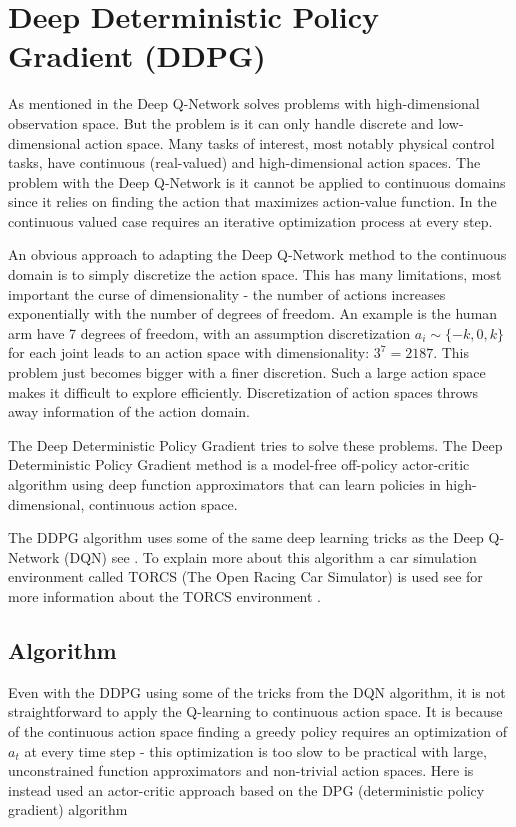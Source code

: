 \section{Deep Deterministic Policy Gradient (DDPG)}\label{DDPG}
As mentioned in  the Deep Q-Network solves problems with high-dimensional observation space. But the problem is it can only handle discrete and low-dimensional action space. Many tasks of interest, most notably physical control tasks, have continuous (real-valued) and high-dimensional action spaces. The problem with the Deep Q-Network is it cannot be applied to continuous domains since it relies on finding the action that maximizes action-value function. In the continuous valued case requires an iterative optimization process at every step. \cite{DBLP:journals/corr/LillicrapHPHETS15}

An obvious approach to adapting the Deep Q-Network method to the continuous domain is to simply discretize the action space. This has many limitations, most important the curse of dimensionality - the number of actions increases exponentially with the number of degrees of freedom. An example is the human arm have 7 degrees of freedom, with an assumption discretization $a_i \sim  \{-k,0,k\}$ for each joint leads to an action space with dimensionality: $3^7 = 2187$. This problem just becomes bigger with a finer discretion. Such a large action space makes it difficult to explore efficiently. Discretization of action spaces throws away information of the action domain.

The Deep Deterministic Policy Gradient tries to solve these problems. The Deep Deterministic Policy Gradient method is a model-free off-policy actor-critic algorithm using deep function approximators that can learn policies in high-dimensional, continuous action space. 

The DDPG algorithm uses some of the same deep learning tricks as the Deep Q-Network (DQN) see . To explain more about this algorithm a car simulation environment called TORCS (The Open Racing Car Simulator) is used see  for more information about the TORCS environment \cite{DDPG_Torcs}.


\subsection{Algorithm}
Even with the DDPG using some of the tricks from the DQN algorithm, it is not straightforward to apply the Q-learning to continuous action space. It is because of the continuous action space finding a greedy policy requires an optimization of \textit{$a_t$} at every time step - this optimization is too slow to be practical with large, unconstrained function approximators and non-trivial action spaces. Here is instead used an actor-critic approach based on the DPG (deterministic policy gradient) algorithm \cite{DBLP:conf/icml/SilverLHDWR14} 

